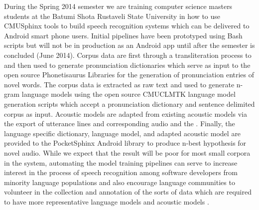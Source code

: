 \documentclass[11pt]{article}
\begin{document}
During the Spring 2014 semester we are training computer science masters students at the Batumi Shota Rustaveli  State University in how to use CMUSphinx tools to build speech recognition systems which can be delivered to Android smart phone users. Initial pipelines have been prototyped using Bash scripts but will not be in production as an Android app until after the semester is concluded (June 2014). Corpus data are first through a transliteration process to and then used to generate pronunciation dictionaries which serve as input  to the open source Phonetisaurus Libraries \cite{Novak:2012} for the generation of pronunciation entries of novel words. The corpus data is extracted as raw text and used to generate n-gram language models using the open source CMUCLMTK \cite{Clarkson:1997} language model generation scripts which accept a pronunciation dictionary and sentence delimited corpus as input. Acoustic models are adapted from existing acoustic models via the export of utterance lines and corresponding audio and the  \cite{Elmahdy:2010}. Finally, the language specific dictionary, language model, and adapted acoustic model are provided to the PocketSphinx Android library to produce n-best hypothesis for novel audio. While we expect that the result will be poor for most small corpora in the system, automating the model training pipelines can serve to increase interest in the process of speech recognition among software developers from minority language populations  and also encourage language communities to volunteer in the collection and annotation of the sorts of data which are required to have more representative language models and acoustic models \cite{Sarfraz:2010}. 
\end{document}
